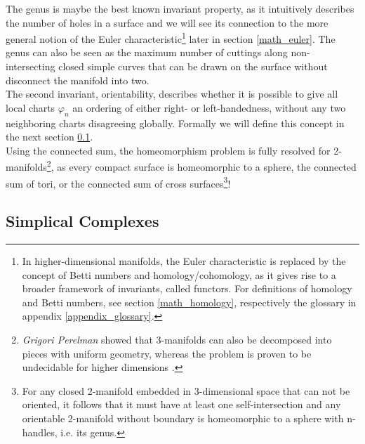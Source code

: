 The genus is maybe the best known invariant property, as it intuitively describes the number of holes in a surface and we will see its connection to the more general notion of the Euler characteristic\footnote{ In higher-dimensional manifolds, the Euler characteristic is replaced by the concept of Betti numbers and homology/cohomology, as it gives rise to a broader framework of invariants, called functors. For definitions of homology and Betti numbers, see section \ref{math_homology}, respectively the glossary in appendix \ref{appendix_glossary}.} later in section \ref{math_euler}.
The genus can also be seen as the maximum number of cuttings along non-intersecting closed simple curves that can be drawn on the surface without disconnect the manifold into two.\\
The second invariant, orientability, describes whether it is possible to give all local charts $\varphi_{n}$ an ordering of either right- or left-handedness, without any two neighboring charts disagreeing globally.
Formally we will define this concept in the next section \ref{math_simplicalcomplexes}.\\
Using the connected sum, the homeomorphism problem is fully resolved for 2-manifolds\footnote{ \textit{Grigori Perelman} showed that 3-manifolds can also be decomposed into pieces with uniform geometry, whereas the problem is proven to be undecidable for higher dimensions \citep[][]{Morgan2007}.}, as every compact surface is homeomorphic to a sphere, the connected sum of tori, or the connected sum of cross surfaces\footnote{ For any closed 2-manifold embedded in 3-dimensional space that can not be oriented, it follows that it must have at least one self-intersection and any orientable 2-manifold without boundary is homeomorphic to a sphere with n-handles, i.e. its genus.}!

\subsection{Simplical Complexes}
\label{math_simplicalcomplexes}

